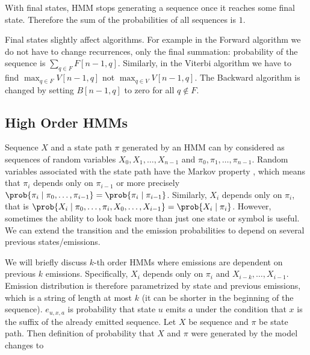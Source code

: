 With final states, HMM stops generating a sequence once it reaches some final
state. Therefore the sum of the probabilities of all sequences is $1$.

Final states slightly affect algorithms. For example in the Forward algorithm
we do not have to change recurrences, only the final summation: probability of
the sequence is $\sum_{q\in F}F[n-1,q]$.  Similarly, in the Viterbi algorithm
we have to find $\max_{q\in F} V[n-1,q]$ not $\max_{q\in V} V[n-1,q]$.  The
Backward algorithm is changed by setting $B[n-1,q]$ to zero for all $q\notin
F$.

\subsection{High Order HMMs}

Sequence $X$ and a state path $\pi$ generated by an HMM can by considered as
sequences of random variables $X_0,X_1,\dots, X_{n-1}$ and
$\pi_0,\pi_1,\dots,\pi_{n-1}$.  Random variables associated with the state path
have the Markov property \cite{Levin2006}, which means that $\pi_i$ depends
only on $\pi_{i-1}$ or more precisely
$\prob{\pi_i\mid\pi_0,\dots,\pi_{i-1}}=\prob{\pi_i\mid\pi_{i-1}}$. Similarly,
$X_i$ depends only on $\pi_i$, that is
$\prob{X_i\mid\pi_0,\dots,\pi_i,X_0,\dots,X_{i-1}}=\prob{X_i\mid\pi_i}$.
However, sometimes the  ability to look back more than just one state or symbol
is useful. We can extend the transition and the emission probabilities to
depend on several previous states/emissions. 

\nocite{Brejova2005,Alexanderson2004}
We will briefly discuss $k$-th order HMMs where emissions are dependent on
previous $k$ emissions. Specifically, $X_i$ depends only on $\pi_i$ and
$X_{i-k},\dots,X_{i-1}$. Emission distribution is therefore parametrized by
state and previous emissions, which is a string of length at most $k$ (it can be
shorter in the beginning of the sequence). $e_{u,x,a}$ is probability that
state $u$ emits $a$ under the condition that $x$ is the suffix of the already emitted
sequence. Let $X$ be sequence and $\pi$ be state path. Then definition
of probability that $X$ and $\pi$ were generated by the model changes to

